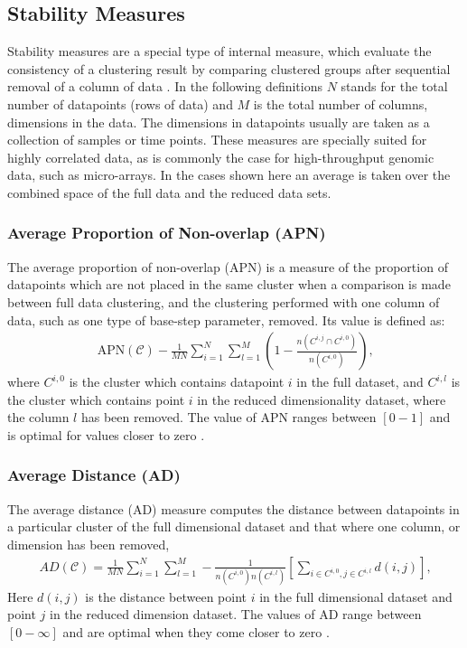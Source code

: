 \subsection{Stability Measures}
Stability  measures are  a  special type  of  internal measure,  which
evaluate the consistency of a clustering result by comparing clustered
groups after sequential removal  of a column of data \cite{datta2003}.
In  the following  definitions  $N$  stands for  the  total number  of
datapoints  (rows of data)  and $M$  is the  total number  of columns,
dimensions  in the  data.  The  dimensions in  datapoints  usually are
taken as a  collection of samples or time  points.  These measures are
specially suited for  highly correlated data, as is  commonly the case
for high-throughput genomic data,  such as micro-arrays.  In the cases
shown here  an average is  taken over the  combined space of  the full
data and the reduced data sets.

\subsubsection{Average Proportion of Non-overlap (APN)}
The  average proportion  of  non-overlap  (APN) is  a  measure of  the
proportion of datapoints which are not placed in the same cluster when
a comparison is made between  full data clustering, and the clustering
performed  with one  column of  data, such  as one  type  of base-step
parameter, removed. Its value is defined as:
\begin{gather}
\text{APN}(\mathcal{C}) - \frac{1}{MN} \sum_{i=1}^{N}\sum_{l=1}^{M} \left( 1
- \frac{n(C^{i,j} \cap C^{i,0})}{n(C^{i,0})} \right) \text{,}
\end{gather}  
where $C^{i,0}$ is the cluster which contains datapoint $i$ in the
full dataset, and $C^{i,l}$ is the cluster which contains point $i$ in
the  reduced dimensionality  dataset, where  the column  $l$  has been
removed.  The  value of APN ranges between $[0-1]$  and is optimal
for values closer to zero \cite{datta2003, brock2008}.

\subsubsection{Average Distance (AD)}
The average distance (AD) measure computes the distance between datapoints in a
particular cluster of the full  dimensional dataset and that where one
column, or dimension has been removed,
\begin{gather}
AD(\mathcal{C})=\frac{1}{MN}       \sum_{i=1}^{N}\sum_{l=1}^{M}      -
\frac{1}{n(C^{i,0})n(C^{i,l})}  \left[  \sum_{i  \in  C^{i,0},  j  \in
    C^{i,l}} d(i,j) \right] \text{,}
\end{gather}
Here $d(i,j)$ is the distance between point $i$ in the full dimensional
dataset and point $j$ in the reduced dimension dataset.
The values of AD range between $[0-\infty]$ and are optimal when they
come closer to zero \cite{datta2003, brock2008}.

